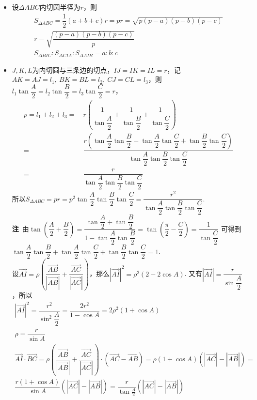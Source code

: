 \begin{itemize}[leftmargin=\inteval{\myitemleftmargin}pt,itemsep=
   \inteval{\myitemitempsep}pt,topsep=\inteval{\myitemtopsep}pt]
\item 设$ \Delta ABC $内切圆半径为$ r $，则
\begin{gather*}
    S_{\Delta ABC}=\dfrac{1}{2}(a+b+c)r=pr=\sqrt{p(p-a)(p-b)(p-c)} \\
    r=\sqrt{\dfrac{(p-a)(p-b)(p-c)}{p}} \\
    S_{\Delta BIC}:S_{\Delta CIA}:S_{\Delta AIB}=a:b:c
\end{gather*}
\item $ J,K,L $为内切圆与三条边的切点，$ IJ=IK=IL=r $，记$ AK=AJ=l_1,\ 
BK=BL=l_2,\ CJ=CL=l_3 $，则
$ l_1\tan\dfrac{A}{2}=l_2\tan\dfrac{B}{2}=l_3\tan\dfrac{C}{2}=r $，
\begin{align*}
    p=l_1+l_2+l_3=&\ r\left(\dfrac{1}{\tan\dfrac{A}{2}}
    +\dfrac{1}{\tan\dfrac{B}{2}}+\dfrac{1}{\tan\dfrac{C}{2}} \right) \\
    =&\ \dfrac{r\left(\tan\dfrac{A}{2}\tan\dfrac{B}{2}+
        \tan\dfrac{A}{2}\tan\dfrac{C}{2}+\tan\dfrac{B}{2}\tan\dfrac{C}{2}
        \right)}{\tan\dfrac{A}{2}\tan\dfrac{B}{2}\tan\dfrac{C}{2}} \\
    =&\ \dfrac{r}{\tan\dfrac{A}{2}\tan\dfrac{B}{2}\tan\dfrac{C}{2}}
\end{align*}
所以$ S_{\Delta ABC}=pr=p^2\tan\dfrac{A}{2}\tan\dfrac{B}{2}\tan\dfrac{C}{2}=
\dfrac{r^2}{\tan\dfrac{A}{2}\tan\dfrac{B}{2}\tan\dfrac{C}{2}} $. \\
\textbf{注}\ 由$ \tan(\dfrac{A}{2}+\dfrac{B}{2})=\dfrac{\tan \dfrac{A}{2}+\tan \dfrac{B}{2}}
{1-\tan \dfrac{A}{2}\tan \dfrac{B}{2}}=\tan(\dfrac{\pi}{2}-\dfrac{C}{2})=
\dfrac{1}{\tan \dfrac{C}{2}} $
可得到$ \tan\dfrac{A}{2}\tan\dfrac{B}{2}+\tan\dfrac{A}{2}\tan\dfrac{C}{2}+
\tan\dfrac{B}{2}\tan\dfrac{C}{2}=1 $. \\
设$ \vec{AI}=\rho\left(\dfrac{\vec{AB}}{|
    \vec{AB}|}+\dfrac{\vec{AC}}{|
    \vec{AC}|}\right) $，那么$ |\vec{AI}|^2=\rho^2(2+2\cos A) $. 
又有$ |\vec{AI}|=\dfrac{r}{\sin \dfrac{A}{2}} $，所以
\begin{gather*}
    |\vec{AI}|^2=\dfrac{r^2}{\sin^2 \dfrac{A}{2}}=
    \dfrac{2r^2}{1-\cos A}= 2\rho^2(1+\cos A) \\
    \rho=\dfrac{r}{\sin A} \\
    \vec{AI}\cdot\vec{BC}=\rho\left(\dfrac{
        \vec{AB}}{|\vec{AB}|}+\dfrac{
        \vec{AC}}{|\vec{AC}|}\right)\cdot(\vec{AC}-
    \vec{AB})=\rho(1+\cos A)\left(|\vec{AC}|
    -|\vec{AB}|\right)=\\
    \dfrac{r(1+\cos A)}{\sin A}
    \left(|\vec{AC}|-|\vec{AB}|\right)=
    \dfrac{r}{\tan \frac{A}{2}}
    \left(|\vec{AC}|-|\vec{AB}|\right)
\end{gather*}


\end{itemize}
